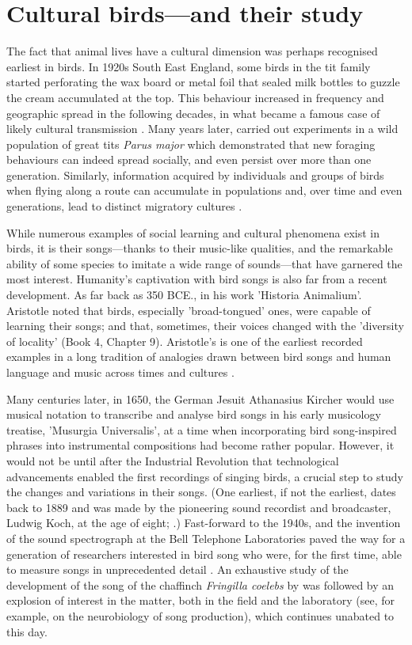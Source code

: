 \section{Cultural birds---and their study}
The fact that animal lives have a cultural dimension was perhaps recognised earliest in birds. In 1920s South East England, some birds in the tit family started perforating the wax board or metal foil that sealed milk bottles to guzzle the cream accumulated at the top. This behaviour increased in frequency and geographic spread in the following decades, in what became a famous case of likely cultural transmission \autocite{fisher1949}. Many years later, \textcite{aplin2015} carried out experiments in a wild population of great tits \textit{Parus major} which demonstrated that new foraging behaviours can indeed spread socially, and even persist over more than one generation. Similarly, information acquired by individuals and groups of birds when flying along a route can accumulate in populations and, over time and even generations, lead to distinct migratory cultures \autocite{berdahl2018,byholm2022,jesmer2018,sasaki2017}.

While numerous examples of social learning and cultural phenomena exist in birds, it is their songs---thanks to their music-like qualities, and the remarkable ability of some species to imitate a wide range of sounds---that have garnered the most interest. Humanity’s captivation with bird songs is also far from a recent development. As far back as 350 BCE., in his work 'Historia Animalium'. Aristotle noted that birds, especially 'broad-tongued’ ones, were capable of learning their songs; and that, sometimes, their voices changed with the 'diversity of locality’ (Book 4, Chapter 9). Aristotle’s is one of the earliest recorded examples in a long tradition of analogies drawn between bird songs and human language and music across times and cultures \autocite{kleczkowska2015,zirin1980}.

Many centuries later, in 1650, the German Jesuit Athanasius Kircher would use musical notation to transcribe and analyse bird songs in his early musicology treatise, 'Musurgia Universalis', at a time when incorporating bird song-inspired phrases into instrumental compositions had become rather popular. However, it would not be until after the Industrial Revolution that technological advancements enabled the first recordings of singing birds, a crucial step to study the changes and variations in their songs. (One earliest, if not the earliest, dates back to 1889 and was made by the pioneering sound recordist and broadcaster, Ludwig Koch, at the age of eight; \cite{britishlibrary2023}.) Fast-forward to the 1940s, and the invention of the sound spectrograph at the Bell Telephone Laboratories paved the way for a generation of researchers interested in bird song who were, for the first time, able to measure songs in unprecedented detail \autocite{baker2001a,koenig1946}. An exhaustive study of the development of the song of the chaffinch \textit{Fringilla coelebs} by \textcite{thorpe1958} was followed by an explosion of interest in the matter, both in the field \autocite{Marler1962,marler1964} and the laboratory (see, for example, \cite{nottebohm1976} on the neurobiology of song production), which continues unabated to this day.

